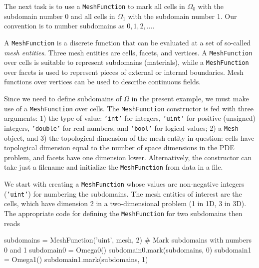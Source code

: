 The next task is to use a {\fontsize{10pt}{10pt}\texttt{MeshFunction}} to mark all
cells in $\Omega_0$ with the subdomain number 0 and all cells in $\Omega_1$
with the subdomain number 1. 
Our convention is to number subdomains as $0,1,2,\ldots$.

A {\fontsize{10pt}{10pt}\texttt{MeshFunction}} is a discrete function that can be evaluated at a set
of so-called \emph{mesh entities}. Three mesh entities are
cells, facets, and vertices. A {\fontsize{10pt}{10pt}\texttt{MeshFunction}} over cells is suitable to
represent subdomains (materials), while a {\fontsize{10pt}{10pt}\texttt{MeshFunction}} over
facets is used to represent pieces of external or internal boundaries.
Mesh functions over vertices can be used to describe continuous fields.

Since we need to define subdomains of $\Omega$
in the present example, we must make use
of a {\fontsize{10pt}{10pt}\texttt{MeshFunction}} over cells. The 
{\fontsize{10pt}{10pt}\texttt{MeshFunction}} constructor is fed with three arguments: 1) the type
of value: {\fontsize{10pt}{10pt}\texttt{'int'}} for integers, {\fontsize{10pt}{10pt}\texttt{'uint'}} for positive
(unsigned) integers, {\fontsize{10pt}{10pt}\texttt{'double'}} for real numbers, and
{\fontsize{10pt}{10pt}\texttt{'bool'}} for logical values; 2) a {\fontsize{10pt}{10pt}\texttt{Mesh}} object, and 3)
the topological dimension of the mesh entity in question: cells
have topological dimension equal to the number of space dimensions in
the PDE problem, and facets have one dimension lower.
Alternatively, the constructor can take just a filename
and initialize the {\fontsize{10pt}{10pt}\texttt{MeshFunction}} from data in a file. 

We start with creating a {\fontsize{10pt}{10pt}\texttt{MeshFunction}} whose
values are non-negative integers ({\fontsize{10pt}{10pt}\texttt{'uint'}})
for numbering the subdomains.
The mesh entities of interest are the cells, which have dimension 2
in a two-dimensional problem (1 in 1D, 3 in 3D). The appropriate code for
defining the {\fontsize{10pt}{10pt}\texttt{MeshFunction}} for two subdomains then reads
\begin{python}
subdomains = MeshFunction('uint', mesh, 2)
# Mark subdomains with numbers 0 and 1
subdomain0 = Omega0()
subdomain0.mark(subdomains, 0)
subdomain1 = Omega1()
subdomain1.mark(subdomains, 1)
\end{python}

